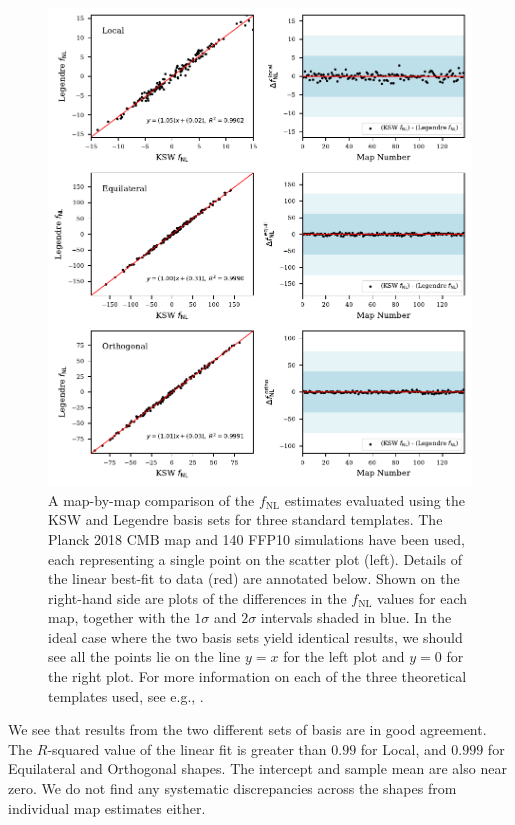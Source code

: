 \begin{figure}[htbp!] 
	\centering 
	\includegraphics{map_by_map_Legendre_KSW.pdf}
	\caption{A map-by-map comparison of the $f_\text{NL}$ estimates evaluated using the KSW and Legendre basis sets for three standard templates. The Planck 2018 CMB map and 140 FFP10 simulations have been used, each representing a single point on the scatter plot (left). Details of the linear best-fit to data (red) are annotated below. Shown on the right-hand side are plots of the differences in the $f_\text{NL}$ values for each map, together with the $1\sigma$ and $2\sigma$ intervals shaded in blue. In the ideal case where the two basis sets yield identical results, we should see all the points lie on the line $y=x$ for the left plot and $y=0$ for the right plot. For more information on each of the three theoretical templates used, see e.g., \cite{PlanckCollaboration2013}.}
	\label{fig:map_by_map_Legendre_KSW}
\end{figure}

We see that results from the two different sets of basis are in good agreement. The $R$-squared value of the linear fit is greater than $0.99$ for Local, and $0.999$ for Equilateral and Orthogonal shapes. The intercept and sample mean are also near zero. We do not find any systematic discrepancies across the shapes from individual map estimates either.

